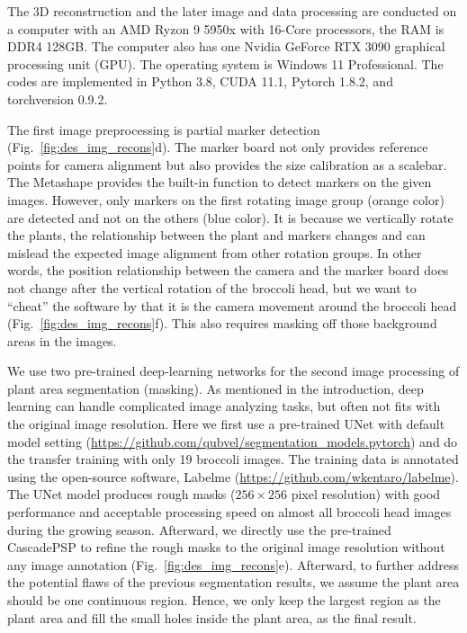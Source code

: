 The 3D reconstruction and the later image and data processing are conducted on a computer with an AMD Ryzon 9 5950x with 16-Core processors, the RAM is DDR4 128GB. The computer also has one Nvidia GeForce RTX 3090 graphical processing unit (GPU). The operating system is Windows 11 Professional. The codes are implemented in Python 3.8, CUDA 11.1, Pytorch 1.8.2, and torchversion 0.9.2.

The first image preprocessing is partial marker detection (Fig.~\ref{fig:des_img_recons}d). The marker board not only provides reference points for camera alignment but also provides the size calibration as a scalebar. The Metashape provides the built-in function to detect markers on the given images. However, only markers on the first rotating image group (orange color) are detected and not on the others (blue color). It is because we vertically rotate the plants, the relationship between the plant and markers changes and can mislead the expected image alignment from other rotation groups. In other words, the position relationship between the camera and the marker board does not change after the vertical rotation of the broccoli head, but we want to ``cheat'' the software by that it is the camera movement around the broccoli head (Fig.~\ref{fig:des_img_recons}f). This also requires masking off those background areas in the images.

We use two pre-trained deep-learning networks for the second image processing of plant area segmentation (masking). As mentioned in the introduction, deep learning can handle complicated image analyzing tasks, but often not fits with the original image resolution. Here we first use a pre-trained UNet with default model setting (\url{https://github.com/qubvel/segmentation_models.pytorch}) and do the transfer training with only 19 broccoli images. The training data is annotated using the open-source software, Labelme (\url{https://github.com/wkentaro/labelme}). The UNet model produces rough masks ($256 \times 256$ pixel resolution) with good performance and acceptable processing speed on almost all broccoli head images during the growing season. Afterward, we directly use the pre-trained CascadePSP \citep[\url{https://github.com/hkchengrex/CascadePSP}]{cheng_cascadepsp_2020} to refine the rough masks to the original image resolution without any image annotation (Fig.~\ref{fig:des_img_recons}e). Afterward, to further address the potential flaws of the previous segmentation results, we assume the plant area should be one continuous region. Hence, we only keep the largest region as the plant area and fill the small holes inside the plant area, as the final result.

